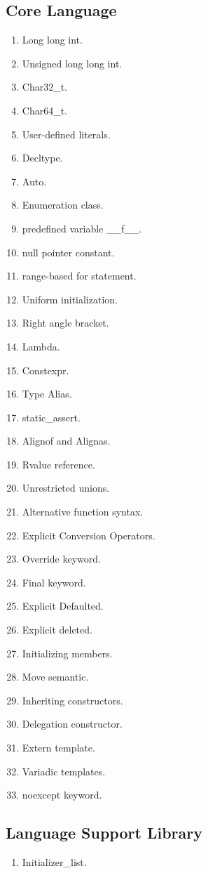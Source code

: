 \documentclass[11pt,]{report}
\begin{document}
\subsection{Core Language}
\label{sub-section: Core language}
\begin{enumerate}
\item Long long int.
\item Unsigned long long int.
\item Char32\_t.
\item Char64\_t.
\item User-defined literals.
\item Decltype.
\item Auto.
\item Enumeration class.
\item predefined variable \_\_f\_\_.
\item null pointer constant.
\item range-based for statement.
\item Uniform initialization.
\item Right angle bracket.
\item Lambda.
\item Constexpr.
\item Type Alias.
\item static\_assert.
\item Alignof and Alignas.
\item Rvalue reference.
\item Unrestricted unions.
\item Alternative function syntax.
\item Explicit Conversion Operators.
\item Override keyword.
\item Final keyword.
\item Explicit Defaulted.
\item Explicit deleted.
\item Initializing  members.
\item Move semantic.
\item Inheriting constructors.
\item Delegation constructor.
\item Extern template.
\item Variadic templates.
\item noexcept keyword.
\end{enumerate}


\subsection{Language Support Library }
\label{Language support library }
\begin{enumerate}
\item Initializer\_list.
\end{enumerate}
\end{document}
